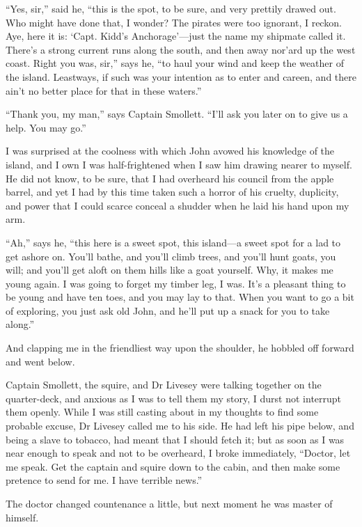 \enquote{Yes, sir,} said he, \enquote{this is the spot, to be sure, and very prettily drawed out. Who might have done that, I wonder? The pirates were too ignorant, I reckon. Aye, here it is: ‘Capt. Kidd’s Anchorage’---just the name my shipmate called it. There’s a strong current runs along the south, and then away nor’ard up the west coast. Right you was, sir,} says he, \enquote{to haul your wind and keep the weather of the island. Leastways, if such was your intention as to enter and careen, and there ain’t no better place for that in these waters.}

\enquote{Thank you, my man,} says Captain Smollett. \enquote{I’ll ask you later on to give us a help. You may go.}

I was surprised at the coolness with which John avowed his knowledge of the island, and I own I was half-frightened when I saw him drawing nearer to myself. He did not know, to be sure, that I had overheard his council from the apple barrel, and yet I had by this time taken such a horror of his cruelty, duplicity, and power that I could scarce conceal a shudder when he laid his hand upon my arm.

\enquote{Ah,} says he, \enquote{this here is a sweet spot, this island---a sweet spot for a lad to get ashore on. You’ll bathe, and you’ll climb trees, and you’ll hunt goats, you will; and you’ll get aloft on them hills like a goat yourself. Why, it makes me young again. I was going to forget my timber leg, I was. It’s a pleasant thing to be young and have ten toes, and you may lay to that. When you want to go a bit of exploring, you just ask old John, and he’ll put up a snack for you to take along.}

And clapping me in the friendliest way upon the shoulder, he hobbled off forward and went below.

Captain Smollett, the squire, and Dr Livesey were talking together on the quarter-deck, and anxious as I was to tell them my story, I durst not interrupt them openly. While I was still casting about in my thoughts to find some probable excuse, Dr Livesey called me to his side. He had left his pipe below, and being a slave to tobacco, had meant that I should fetch it; but as soon as I was near enough to speak and not to be overheard, I broke immediately, \enquote{Doctor, let me speak. Get the captain and squire down to the cabin, and then make some pretence to send for me. I have terrible news.}

The doctor changed countenance a little, but next moment he was master of himself.

